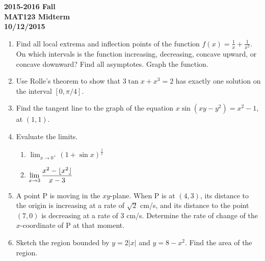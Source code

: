 \documentclass[a4paper, 12pt]{article}
\renewcommand{\headrulewidth}{0pt}
\DeclarePairedDelimiter\floor{\lfloor}{\rfloor}
\begin{document}
\pagestyle{empty}

\begin{center}
\textbf{2015-2016 Fall\\MAT123 Midterm\\10/12/2015}
\end{center}

\begin{enumerate}[leftmargin=*,label=\textbf{\arabic*.}]

\item Find all local extrema and inflection points of the function $f(x)=\frac{1}{x}+\frac{1}{x^2}$. On which intervals is the function increasing, decreasing, concave upward, or concave downward? Find all asymptotes. Graph the function.

\item Use Rolle's theorem to show that $3\tan x + x^3 = 2$ has exactly one solution on the interval $[0,\pi/4]$.

\item Find the tangent line to the graph of the equation $x\sin\left(xy-y^2\right)=x^2-1$, at $(1,1)$.

\item Evaluate the limits.

\begin{enumerate}[leftmargin=*,label=\textbf{\alph*.}]

\item $\displaystyle\lim_{x\to 0^+}(1+\sin x)^{\frac{1}{x}}$

\item $\displaystyle\lim_{x\to 3}\frac{x^2-\floor{x^2}}{x-3}$

\end{enumerate}

\item A point P is moving in the $xy$-plane. When P is at $(4, 3)$, its distance to the origin is increasing at a rate of $\sqrt{2}$ cm/s, and its distance to the point $(7, 0)$ is decreasing at a rate of 3 cm/s. Determine the rate of change of the $x$-coordinate of P at that moment.

\item Sketch the region bounded by $y=2|x|$ and $y=8-x^2$. Find the area of the region.

\end{enumerate}

\newpage
\pagestyle{fancy}
\renewcommand{\headrulewidth}{1pt}
\end{document}
